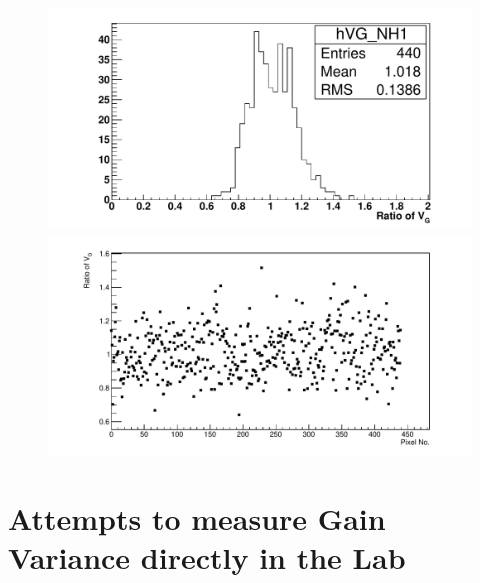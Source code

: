 \begin{figure} %
\includegraphics[width=\textwidth]{chapters/graphs/GainVarsMeas/LL_m04_2016-06-11/Set0and2/GainVairanceHist_Average_Method2.pdf}
\caption{}
\vspace{3mm}
\includegraphics[width=\textwidth]{chapters/graphs/GainVarsMeas/LL_m04_2016-06-11/Set0and2/GainVars_Vs_Pixel_GainVariance_Average_Method2_Set0and2.pdf}
\caption{}
\end{figure}

\section{Attempts to measure Gain Variance directly in the Lab}